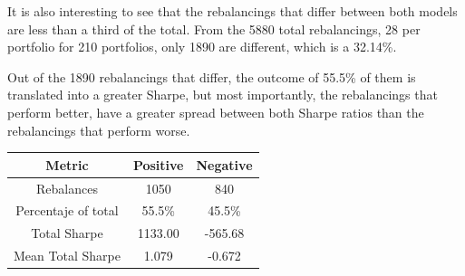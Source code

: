 \documentclass{article}
\begin{document}
It is also interesting to see that the rebalancings that differ between both models are less than a third of the total. From the 5880 total rebalancings, 28 per portfolio for 210 portfolios, only 1890 are different, which is a 32.14\%. 

Out of the 1890 rebalancings that differ, the outcome of 55.5\% of them is translated into a greater Sharpe, but most importantly, the rebalancings that perform better, have a greater spread between both Sharpe ratios than the rebalancings that perform worse.

\begin{center}
\begin{tabular}{ |c|c|c|} 
\hline
 \textbf{Metric} & \textbf{Positive} & \textbf{Negative}\\ 
 \hline
 Rebalances & 1050 & 840\\ 
 \hline
 Percentaje of total & 55.5\% & 45.5\%\\
 \hline
 Total Sharpe & 1133.00 & -565.68\\ 
 \hline
 Mean Total Sharpe  & 1.079 & -0.672\\ 
 \hline
 \end{tabular}
\end{center}
\end{document}
